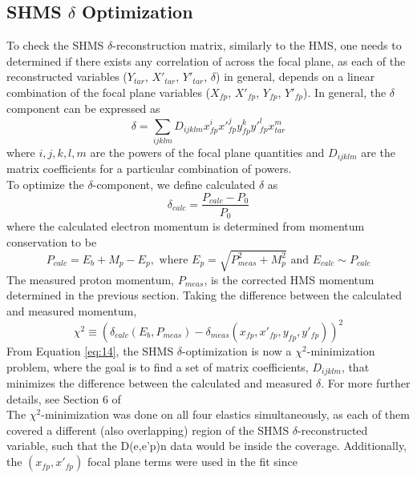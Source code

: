 \documentclass[11pt]{article}
\begin{document}
\subsection{SHMS $\delta$ Optimization}
To check the SHMS $\delta$-reconstruction matrix, similarly to the HMS, one needs to determined if there exists any
correlation of across the focal plane, as each of the reconstructed variables ($Y_{tar}$, $X'_{tar}$, $Y'_{tar}$, $\delta$) in general,
depends on a linear combination of the focal plane variables ($X_{fp}$, $X'_{fp}$, $Y_{fp}$, $Y'_{fp}$).
In general, the $\delta$ component can be expressed as
\begin{equation}
  \delta = \sum_{ijklm} D_{ijklm}x^{i}_{fp}x'^{j}_{fp}y^{k}_{fp}y'^{l}_{fp}x^{m}_{tar}
  \label{eq:11}
\end{equation}
where $i,j,k,l,m$ are the powers of the focal plane quantities and $D_{ijklm}$ are the matrix
coefficients for a particular combination of powers. \\
\indent To optimize the $\delta$-component, we define calculated $\delta$ as
\begin{equation}
  \delta_{calc} = \frac{P_{calc} - P_{0}}{P_{0}} 
\end{equation}
where the calculated electron momentum is determined from momentum conservation to be
\begin{equation}
  P_{calc} = E_{b} + M_{p} - E_{p}, \text{ where } E_{p} = \sqrt{P_{meas}^{2} + M_{p}^{2} } \text{   and   } E_{calc} \sim P_{calc}
\end{equation}
The measured proton momentum, $P_{meas}$, is the corrected HMS momentum determined in the previous
section.
Taking the difference between the calculated and measured momentum,
\begin{equation}
  \chi^{2} \equiv (\delta_{calc} (E_{b}, P_{meas}) - \delta_{meas} (x_{fp}, x'_{fp}, y_{fp}, y'_{fp}))^{2}
  \label{eq:14}
\end{equation}
From Equation \ref{eq:14}, the SHMS $\delta$-optimization is now a $\chi^{2}$-minimization problem, where the goal is
to find a set of matrix coefficients,  $D_{ijklm}$, that minimizes the difference between the calculated and measured
$\delta$. For more further details, see Section 6 of \cite{HMS_notes} \\
\indent The $\chi^{2}$-minimization was done on all four elastics simultaneously, as each of them covered
a different (also overlapping) region of the SHMS $\delta$-reconstructed variable, such that the D(e,e'p)n data would be
inside the coverage. Additionally,  the $(x_{fp}, x'_{fp})$ focal plane terms were used in the fit since
\end{document}
